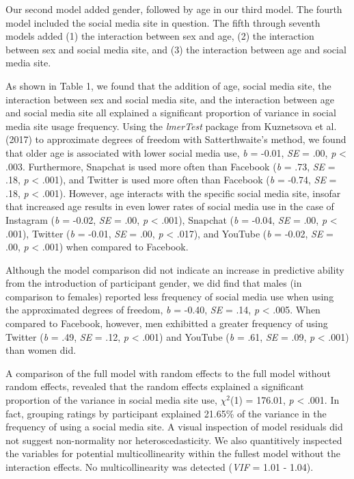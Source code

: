 \documentclass[man, fleqn, noextraspace]{apa6}
\theoremstyle{definition}
\theoremstyle{definition}
\theoremstyle{definition}
\theoremstyle{remark}
\begin{document}
Our second model added gender, followed by age in our third model. The
fourth model included the social media site in question. The fifth
through seventh models added (1) the interaction between sex and age,
(2) the interaction between sex and social media site, and (3) the
interaction between age and social media site.

As shown in Table 1, we found that the addition of age, social media
site, the interaction between sex and social media site, and the
interaction between age and social media site all explained a
significant proportion of variance in social media site usage frequency.
Using the \emph{lmerTest} package from Kuznetsova et al. (2017) to
approximate degrees of freedom with Satterthwaite's method, we found
that older age is associated with lower social media use, \emph{b} =
-0.01, \emph{SE} = .00, \emph{p} \textless{} .003. Furthermore, Snapchat
is used more often than Facebook (\emph{b} = .73, \emph{SE} = .18,
\emph{p} \textless{} .001), and Twitter is used more often than Facebook
(\emph{b} = -0.74, \emph{SE} = .18, \emph{p} \textless{} .001). However,
age interacts with the specific social media site, insofar that
increased age results in even lower rates of social media use in the
case of Instagram (\emph{b} = -0.02, \emph{SE} = .00, \emph{p}
\textless{} .001), Snapchat (\emph{b} = -0.04, \emph{SE} = .00, \emph{p}
\textless{} .001), Twitter (\emph{b} = -0.01, \emph{SE} = .00, \emph{p}
\textless{} .017), and YouTube (\emph{b} = -0.02, \emph{SE} = .00,
\emph{p} \textless{} .001) when compared to Facebook.

Although the model comparison did not indicate an increase in predictive
ability from the introduction of participant gender, we did find that
males (in comparison to females) reported less frequency of social media
use when using the approximated degrees of freedom, \emph{b} = -0.40,
\emph{SE} = .14, \emph{p} \textless{} .005. When compared to Facebook,
however, men exhibitted a greater frequency of using Twitter (\emph{b} =
.49, \emph{SE} = .12, \emph{p} \textless{} .001) and YouTube (\emph{b} =
.61, \emph{SE} = .09, \emph{p} \textless{} .001) than women did.

A comparison of the full model with random effects to the full model
without random effects, revealed that the random effects explained a
significant proportion of the variance in social media site use,
\(\chi^2\)(1) = 176.01, \emph{p} \textless{} .001. In fact, grouping
ratings by participant explained 21.65\% of the variance in the
frequency of using a social media site. A visual inspection of model
residuals did not suggest non-normality nor heteroscedasticity. We also
quantitively inspected the variables for potential multicollinearity
within the fullest model without the interaction effects. No
multicollinearity was detected (\emph{VIF} = 1.01 - 1.04).
\end{document}
